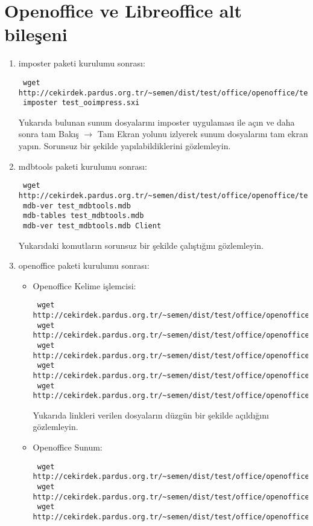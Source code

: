 \documentclass[a4paper,10pt]{article}
\begin{document}
\section{Openoffice ve Libreoffice alt bileşeni}
\begin{enumerate}
 \item imposter paketi kurulumu sonrası:
\begin{verbatim}
 wget http://cekirdek.pardus.org.tr/~semen/dist/test/office/openoffice/test_ooimpress.sxi
 imposter test_ooimpress.sxi
\end{verbatim}
Yukarıda bulunan sunum dosyalarını imposter uygulaması ile açın ve daha sonra tam Bakış $\rightarrow$ Tam Ekran yolunu izlyerek sunum dosyalarını tam ekran yapın. Sorunsuz bir şekilde yapılabildiklerini gözlemleyin.

 \item mdbtools paketi kurulumu sonrası:
\begin{verbatim}
 wget http://cekirdek.pardus.org.tr/~semen/dist/test/office/openoffice/test_mdbtools.mdb
 mdb-ver test_mdbtools.mdb
 mdb-tables test_mdbtools.mdb
 mdb-ver test_mdbtools.mdb Client
\end{verbatim}

Yukarıdaki komutların sorunsuz bir şekilde çalıştığını gözlemleyin.

\item openoffice paketi kurulumu sonrası:
\begin{itemize}
\item Openoffice Kelime işlemcisi:
\begin{verbatim}
 wget http://cekirdek.pardus.org.tr/~semen/dist/test/office/openoffice/test_oowriter.doc
 wget http://cekirdek.pardus.org.tr/~semen/dist/test/office/openoffice/test_oowriter.odt
 wget http://cekirdek.pardus.org.tr/~semen/dist/test/office/openoffice/test_oowriter.sxw
 wget http://cekirdek.pardus.org.tr/~semen/dist/test/office/openoffice/test_oowriter.ott
 wget http://cekirdek.pardus.org.tr/~semen/dist/test/office/openoffice/test_oowriter.html
\end{verbatim}

Yukarıda linkleri verilen dosyaların düzgün bir şekilde açıldığını gözlemleyin.

\item Openoffice Sunum:
\begin{verbatim}
 wget http://cekirdek.pardus.org.tr/~semen/dist/test/office/openoffice/test_ooimpress.odp
 wget http://cekirdek.pardus.org.tr/~semen/dist/test/office/openoffice/test_ooimpress.ppt
 wget http://cekirdek.pardus.org.tr/~semen/dist/test/office/openoffice/test_ooimpress.pot
\end{verbatim}


\end{itemize}
\end{enumerate}
\end{document}
